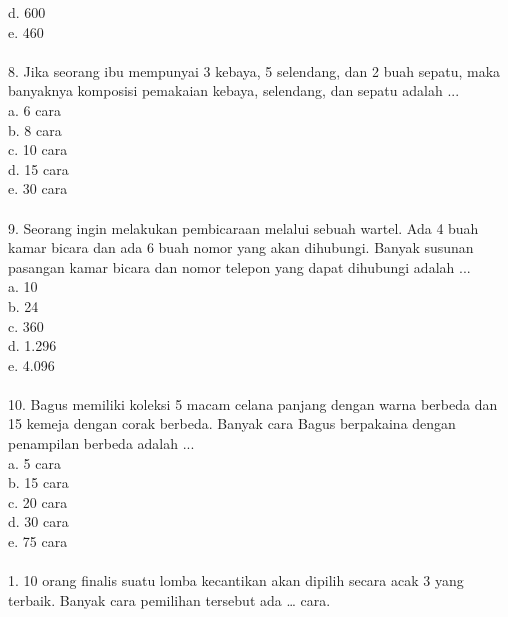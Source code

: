 \documentclass[11pt,fleqn]{book} %
\begin{document}
d.	600\\

e.	460\\
\\

8. Jika seorang ibu mempunyai 3 kebaya, 5 selendang, dan 2 buah sepatu, maka banyaknya komposisi pemakaian kebaya, selendang, dan sepatu adalah ...\\

a.	6 cara\\

b.	8 cara\\

c.	10 cara\\

d.	15 cara\\

e.	30 cara\\
\\

9. Seorang ingin melakukan pembicaraan melalui sebuah wartel. Ada 4 buah kamar bicara dan ada 6 buah nomor yang akan dihubungi. Banyak susunan pasangan kamar bicara dan nomor telepon yang dapat dihubungi adalah ...\\ 

a.	10\\

b.	24\\

c.	360\\

d.	1.296\\

e.	4.096\\
\\

10. Bagus memiliki koleksi 5 macam celana panjang dengan warna berbeda dan 15 kemeja dengan corak berbeda. Banyak cara Bagus berpakaina dengan penampilan berbeda adalah ...\\ 

a.	5 cara\\

b.	15 cara\\

c.	20 cara\\

d.	30 cara\\

e.	75 cara\\
\\

1. 10 orang finalis suatu lomba kecantikan akan dipilih secara acak 3 yang terbaik. Banyak cara pemilihan tersebut ada … cara.\\
\end{document}
